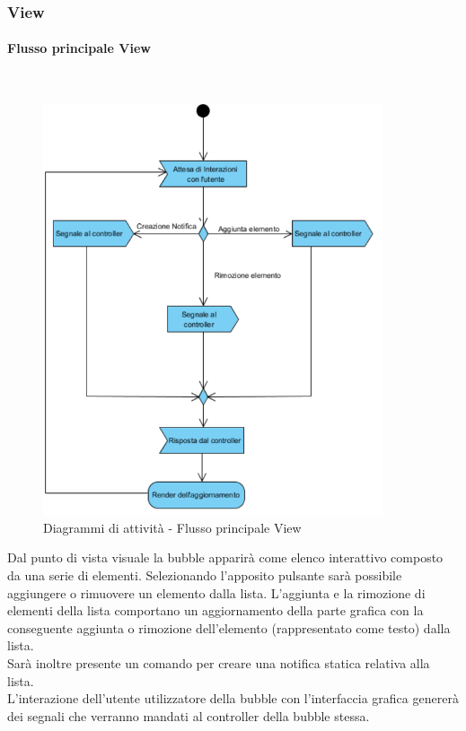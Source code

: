 \subsubsection{View}

\paragraph{Flusso principale View}\mbox{}\\
\nopagebreak
\begin{figure}[H]
	\centering
	\includegraphics[width=10cm]{../../documenti/SpecificaTecnica/diagrammi_img/attivita/viewmainflow.png}
	\caption{Diagrammi di attività - Flusso principale View}
\end{figure}

Dal punto di vista visuale la bubble apparirà come elenco interattivo composto da una serie di elementi. Selezionando l'apposito pulsante sarà possibile aggiungere o rimuovere un elemento dalla lista. L'aggiunta e la rimozione di elementi della lista comportano un aggiornamento della parte grafica con la conseguente aggiunta o rimozione dell'elemento (rappresentato come testo) dalla lista.\\
Sarà inoltre presente un comando per creare una notifica statica relativa alla lista.\\
L'interazione dell'utente utilizzatore della bubble con l'interfaccia grafica genererà dei segnali che verranno mandati al controller della bubble stessa.

